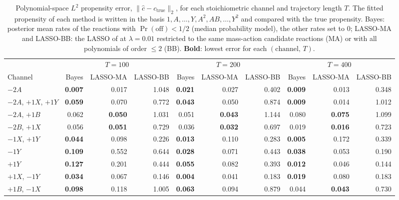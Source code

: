 \begin{table}[htbp]
\centering
\small
\caption{%
  Polynomial-space $L^2$ propensity error, $\|\hat{c} - c_{\mathrm{true}}\|_2$, for each stoichiometric
  channel and trajectory length $T$. The fitted propensity of each method is written in the basis
  $1, A, \dots, Y, A^2, AB, \dots, Y^2$ and compared with the true propensity. Bayes: posterior mean rates of the reactions with
  $\Pr(\text{off})<1/2$ (median probability model), the other rates set to $0$;
  LASSO-MA and LASSO-BB: the LASSO of \cite{siam_Zhang2019} at $\lambda = 0.01$
  restricted to the same mass-action candidate reactions (MA) or with all polynomials of order $\le 2$ (BB).
  \textbf{Bold}: lowest error for each $(\text{channel},\,T)$.
}
\label{tab:comparison-l2}
\setlength{\tabcolsep}{2.5pt}
\begin{tabular}{l rrr rrr rrr}
\toprule
\multicolumn{1}{c}{} & \multicolumn{3}{c}{$T=100$} & \multicolumn{3}{c}{$T=200$} & \multicolumn{3}{c}{$T=400$} \\
\cmidrule(lr){2-4}\cmidrule(lr){5-7}\cmidrule(lr){8-10}
Channel & Bayes & LASSO-MA & LASSO-BB & Bayes & LASSO-MA & LASSO-BB & Bayes & LASSO-MA & LASSO-BB \\
\midrule
$-2A$ & \textbf{0.007} & 0.017 & 1.048 & \textbf{0.021} & 0.027 & 0.402 & \textbf{0.009} & 0.013 & 0.348 \\
$-2A$, $+1X$, $+1Y$ & \textbf{0.059} & 0.070 & 0.772 & \textbf{0.043} & 0.050 & 0.874 & \textbf{0.009} & 0.014 & 1.012 \\
$-2A$, $+1B$ & 0.062 & \textbf{0.050} & 1.031 & 0.051 & \textbf{0.043} & 1.144 & 0.080 & \textbf{0.075} & 1.099 \\
$-2B$, $+1X$ & 0.056 & \textbf{0.051} & 0.729 & 0.036 & \textbf{0.032} & 0.697 & 0.019 & \textbf{0.016} & 0.723 \\
$-1X$, $+1Y$ & \textbf{0.044} & 0.098 & 0.226 & \textbf{0.013} & 0.110 & 0.283 & \textbf{0.005} & 0.172 & 0.339 \\
$-1Y$ & \textbf{0.109} & 0.552 & 0.644 & \textbf{0.028} & 0.071 & 0.443 & \textbf{0.038} & 0.053 & 0.190 \\
$+1Y$ & \textbf{0.127} & 0.201 & 0.444 & \textbf{0.055} & 0.082 & 0.393 & \textbf{0.012} & 0.046 & 0.144 \\
$+1X$, $-1Y$ & \textbf{0.034} & 0.067 & 0.146 & \textbf{0.004} & 0.041 & 0.183 & \textbf{0.019} & 0.080 & 0.183 \\
$+1B$, $-1X$ & \textbf{0.098} & 0.118 & 1.005 & \textbf{0.063} & 0.094 & 0.879 & 0.044 & \textbf{0.043} & 0.730 \\

\end{tabular}
\end{table}
